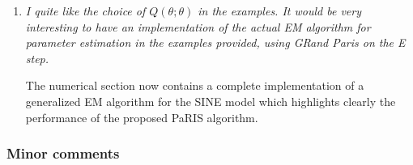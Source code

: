 \documentclass[12pt]{article}
\newcommand{\1}{\mathrm{1}}
\begin{document}
\begin{enumerate}
\item {\em I quite like the choice of $Q(\theta;\theta)$ in the examples. It would be very interesting to
have an implementation of the actual EM algorithm for parameter estimation in the
examples provided, using GRand Paris on the E step.}

\vspace{.3cm}

The numerical section now contains a complete implementation of a generalized EM algorithm for the SINE model which highlights clearly the performance of the proposed PaRIS algorithm.  
\end{enumerate}



\subsubsection*{Minor comments}
\end{document}
